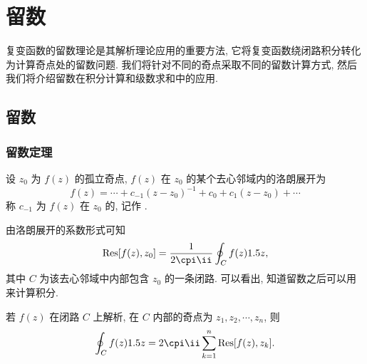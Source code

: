 \chapter{留数}
\label{chapter:5}

复变函数的留数理论是其解析理论应用的重要方法, 它将复变函数绕闭路积分转化为计算奇点处的留数问题.
我们将针对不同的奇点采取不同的留数计算方式, 然后我们将介绍留数在积分计算和级数求和中的应用.



\section{留数}

\subsection{留数定理}

\begin{definition}
  设 $z_0$ 为 $f(z)$ 的孤立奇点, $f(z)$ 在 $z_0$ 的某个去心邻域内的洛朗展开为
  \[
    f(z)=\cdots+c_{-1}(z-z_0)^{-1}+c_0+c_1(z-z_0)+\cdots
  \]
  称 $c_{-1}$ 为 $f(z)$ 在 $z_0$ 的, 记作 \noun{$\Res[f(z),z_0]$}.
\end{definition}

由洛朗展开的系数形式可知
\[
   \Res[f(z),z_0]
  =\frac1{2\cpi\ii}\oint_Cf(z)\d z,
\]
其中 $C$ 为该去心邻域中内部包含 $z_0$ 的一条闭路.
可以看出, 知道留数之后可以用来计算积分.

\begin{theorem}[留数定理]
  \label{thm:residue}
  若 $f(z)$ 在闭路 $C$ 上解析, 在 $C$ 内部的奇点为 $z_1,z_2,\cdots,z_n$, 则
  \[
     \oint_Cf(z)\d z
    =2\cpi\ii\sum_{k=1}^n\Res[f(z),z_k].
  \]
\end{theorem}

